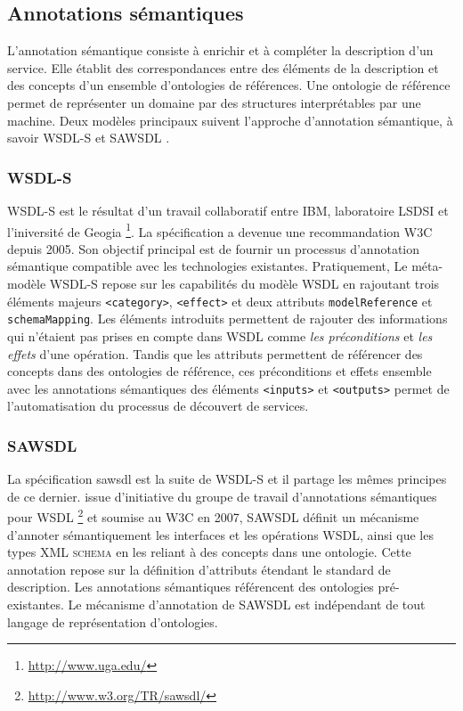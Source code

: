 \newpage
  \subsection{Annotations sémantiques}
  \label{sec:semantic-annot}

  L'annotation sémantique consiste à enrichir et à compléter la
  description d'un service. Elle établit des correspondances entre des
  éléments de la description et des concepts d'un ensemble
  d'ontologies de références. Une ontologie de référence permet de
  représenter un domaine par des structures interprétables par une
  machine. Deux modèles principaux suivent l'approche d'annotation
  sémantique, à savoir \textsc{WSDL-S} et \textsc{SAWSDL}
  \cite{elie2010}.

    \subsubsection{WSDL-S}
    \textsc{WSDL-S} \cite{akkiraju2005web} est le résultat d'un
    travail collaboratif entre IBM, laboratoire LSDSI et l'iniversité
    de Geogia \footnote{\url{http://www.uga.edu/}}.  La spécification
    a devenue une recommandation \textsc{W3C} depuis 2005. Son
    objectif principal est de fournir un processus d'annotation
    sémantique compatible avec les technologies
    existantes. Pratiquement, Le méta-modèle \textsc{WSDL-S} repose
    sur les capabilités du modèle \textsc{WSDL} en rajoutant trois
    éléments majeurs \texttt{<category>}, \texttt{<effect>} et deux
    attributs \texttt{modelReference} et \texttt{schemaMapping}. Les
    éléments introduits permettent de rajouter des informations qui
    n'étaient pas prises en compte dans \textsc{WSDL} comme \emph{les
      préconditions} et \emph{les effets} d'une opération. Tandis que
    les attributs permettent de référencer des concepts dans des
    ontologies de référence, ces préconditions et effets ensemble avec
    les annotations sémantiques des éléments \texttt{<inputs>} et
    \texttt{<outputs>} permet de l'automatisation du processus de
    découvert de services.

    \subsubsection{SAWSDL}
    La spécification \acrshort{sawsdl} \cite{kopecky2007sawsdl} est la
    suite de \textsc{WSDL-S} et il partage les mêmes principes de ce
    dernier. issue d'initiative du groupe de travail d'annotations
    sémantiques pour \textsc{WSDL}
    \footnote{\url{http://www.w3.org/TR/sawsdl/}} et soumise au
    \textsc{W3C} en 2007, \textsc{SAWSDL} définit un mécanisme
    d'annoter sémantiquement les interfaces et les opérations
    \textsc{WSDL}, ainsi que les types \textsc{XML schema} en les
    reliant à des concepts dans une ontologie. Cette annotation repose
    sur la définition d'attributs étendant le standard de
    description. Les annotations sémantiques référencent des
    ontologies pré-existantes. Le mécanisme d'annotation de
    \textsc{SAWSDL} est indépendant de tout langage de représentation
    \cite{lopez2008selection} d'ontologies.

